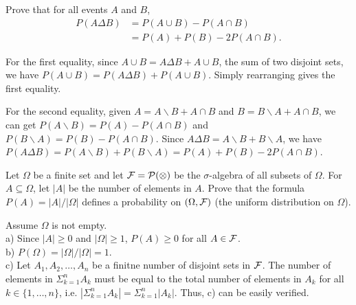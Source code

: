 \begin{exercise}
  Prove that  for all events $A$ and $B$,
  \begin{align*}
    P(A\Delta B) &= P(A\cup B) - P(A\cap B) \\
      &= P(A) + P(B) - 2P(A\cap B).
  \end{align*}
\end{exercise}
\begin{solution}
  For the first equality, since $A\cup B = A\Delta B + A\cup B$, the sum of two disjoint sets, we have $P(A\cup B) = P(A\Delta B) + P(A\cup B)$. Simply rearranging gives the first equality.

  For the second equality, given $A = A\backslash B + A\cap B$ and $B = B\backslash A + A\cap B$, we can get $P(A\backslash B) = P(A) - P(A\cap B)$ and $P(B\backslash A) = P(B) - P(A\cap B)$. Since $A\Delta B = A\backslash B + B\backslash A$, we have $P(A\Delta B) = P(A\backslash B) + P(B\backslash A) = P(A) + P(B) - 2P(A\cap B)$.
\end{solution}


\begin{exercise}
  Let $\Omega$ be a finite set and let $\cal F=\cal P(\Omega)$ be the $\sigma$-algebra of all subsets of $\Omega$. For $A\subseteq \Omega$, let $|A|$ be the number of elements in $A$. Prove that the formula $P(A)=|A|/|\Omega|$ defines a probability on $(\Omega, \cal F)$ (the uniform distribution on $\Omega$).
\end{exercise}
\begin{solution}
  Assume $\Omega$ is not empty. \\
  a) Since $|A|\geq 0$ and $|\Omega|\geq 1$, $P(A)\geq 0$ for all $A\in \cal F$. \\
  b) $P(\Omega) = |\Omega| / |\Omega| = 1$. \\
  c) Let $A_1, A_2, \ldots, A_n$ be a finitne number of disjoint sets in $\cal F$. The number of elements in $\Sigma_{k=1}^n A_k$ must be equal to the total number of elements in $A_k$ for all $k\in\{ 1,\ldots, n \} $, i.e. $|\Sigma_{k=1}^n A_k| = \Sigma_{k=1}^n|A_k|$. Thus, c) can be easily verified.
\end{solution}
